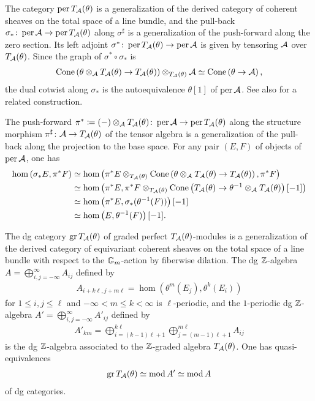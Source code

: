 \documentclass[a4paper,12pt]{amsart}
\begin{document}
The category
$\operatorname{per} T_{\mathcal{A}}(\theta)$
is a generalization
of the derived category of coherent sheaves
on the total space of a line bundle,
and
the pull-back
$
\sigma_* \colon \operatorname{per} \mathcal{A} \to \operatorname{per} T_{\mathcal{A}}(\theta)
$
along $\sigma^\sharp$
is a generalization
of the push-forward
along the zero section.
Its left adjoint
$
\sigma^* \colon \operatorname{per} T_{\mathcal{A}}(\theta) \to \operatorname{per} \mathcal{A}
$
is given by tensoring $\mathcal{A}$ over $T_{\mathcal{A}}(\theta)$.
Since the graph of
$
  \sigma^* \circ \sigma_*
$
is
\begin{align}
  \operatorname{Cone} \left( \theta \otimes_{\mathcal{A}} T_{\mathcal{A}}(\theta) \to T_{\mathcal{A}}(\theta) \right)
   \otimes_{T_{\mathcal{A}}(\theta)} \mathcal{A}
  \simeq \operatorname{Cone} \left( \theta \to \mathcal{A} \right),
\end{align}
the dual cotwist along $\sigma_*$
is the autoequivalence $\theta[1]$
of $\operatorname{per} \mathcal{A}$.
See also \cite{MR3805198}
for a related construction.

The push-forward
$
\pi^* \coloneqq (-) \otimes_{\mathcal{A}} T_{\mathcal{A}}(\theta)
\colon \operatorname{per} \mathcal{A} \to \operatorname{per} T_{\mathcal{A}}(\theta)
$
along the structure morphism
$
 \pi^\sharp \colon \mathcal{A} \to T_{\mathcal{A}}(\theta)
$
of the tensor algebra
is a generalization of the pull-back
along the projection to the base space.
For any pair $(E,F)$ of objects of $\operatorname{per} \mathcal{A}$,
one has
\begin{align}
\hom \left( \sigma_* E, \pi^* F \right)
&\simeq
\hom
\left(
 \pi^* E
 \otimes_{T_{\mathcal{A}}(\theta)}
 \operatorname{Cone}
 \left(
  \theta \otimes_{\mathcal{A}} T_{\mathcal{A}}(\theta) \to T_{\mathcal{A}}(\theta)
 \right)
 ,
 \pi^* F
\right)
\\
&\simeq
\hom
\left(
 \pi^* E
 ,
 \pi^* F
 \otimes_{T_{\mathcal{A}}(\theta)}
 \operatorname{Cone}
 \left(
  T_{\mathcal{A}}(\theta) \to \theta^{-1} \otimes_{\mathcal{A}} T_{\mathcal{A}}(\theta)
 \right)[-1]
\right)
\\
&\simeq
\hom
\left(
 \pi^* E
 ,
 \sigma_* (\theta^{-1}(F))
\right)[-1]
\\
&\simeq
\hom
\left(
 E
 ,
 \theta^{-1}(F)
\right)[-1].
\end{align}

The dg category
$\operatorname{gr} T_{\mathcal{A}}(\theta)$
of graded perfect $T_{\mathcal{A}}(\theta)$-modules
is a generalization
of the derived category of equivariant coherent sheaves
on the total space of a line bundle
with respect to the $\mathbb{G}_m$-action
by fiberwise dilation.
The dg $\mathbb{Z}$-algebra
$
 A = \bigoplus_{i,j=-\infty}^\infty A_{ij}
$
defined by
\begin{align}
 A_{i+k\ell,j+m\ell} = \hom(\theta^m(E_j), \theta^k(E_i))
\end{align}
for $1 \le i,j \le \ell$ and $-\infty < m \le k < \infty$
is $\ell$-periodic,
and the $1$-periodic dg $\mathbb{Z}$-algebra
$
 A' = \bigoplus_{i,j=-\infty}^\infty A'_{ij}
$
defined by
\begin{align}
 A'_{km} = \bigoplus_{i=(k-1)\ell+1}^{k\ell} \bigoplus_{j=(m-1)\ell+1}^{m\ell} A_{ij}
\end{align}
is the dg $\mathbb{Z}$-algebra
associated to the $\mathbb{Z}$-graded algebra $T_{\mathcal{A}}(\theta)$.
One has quasi-equivalences
\begin{align} \label{eq:gr=mod}
 \operatorname{gr} T_{\mathcal{A}}(\theta)
 \simeq  
 \operatorname{mod} A'
 \simeq
 \operatorname{mod} A
\end{align}
of dg categories.
\end{document}
